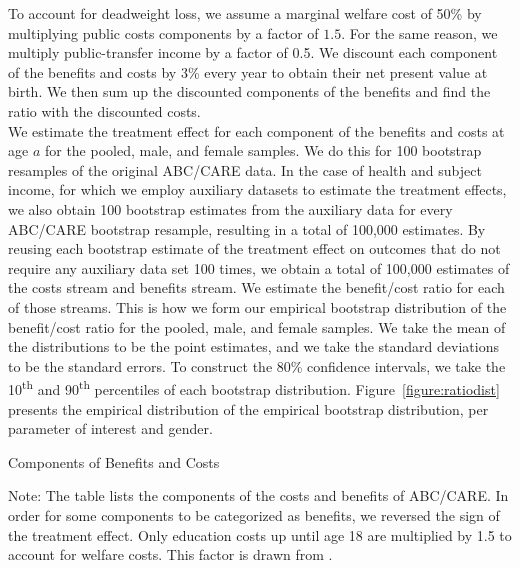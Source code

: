 \noindent To account for deadweight loss, we assume a marginal welfare cost of 50\% by multiplying
public costs components by a factor of $1.5$. For the same reason, we multiply public-transfer
income by a factor of 0.5. We discount each component of the benefits and costs
by 3\% every year to obtain their net present value at birth. We then sum up the discounted
components of the benefits and find the ratio with the discounted costs. \\

\noindent We estimate the treatment effect for each component of the benefits and costs at age $a$ for the pooled, male, and female samples. We do this for 100 bootstrap resamples of the original ABC/CARE data. In the case of health and subject income, for which we employ auxiliary datasets to estimate the treatment effects, we also obtain 100 bootstrap estimates from the auxiliary data for every ABC/CARE bootstrap resample, resulting in a total of 100,000 estimates. By reusing each bootstrap estimate of the treatment effect on outcomes that do not require any auxiliary data set 100 times, we obtain a total of 100,000 estimates of the costs stream and benefits stream. We estimate the benefit/cost ratio for each of those streams. This is how we form our empirical bootstrap distribution of the benefit/cost ratio for the pooled, male, and female samples. We take the mean of the distributions to be the point estimates, and we take the standard deviations to be the standard errors. To construct the 80\% confidence intervals, we take the 10\textsuperscript{th} and 90\textsuperscript{th} percentiles of each bootstrap distribution. Figure~\ref{figure:ratiodist} presents the empirical distribution of the empirical bootstrap distribution, per parameter of interest and gender.

\begin{table}[H]
\begin{threeparttable}
\caption{Components of Benefits and Costs}
\label{table:bc_comp}
\centering

\begin{tablenotes}
\footnotesize
\item Note: The table lists the components of the costs and benefits of ABC/CARE.
In order for some components to be categorized as benefits, we reversed the sign
of the treatment effect. Only education costs up until age 18 are multiplied by 1.5 to account for welfare costs. This factor is drawn from \citet{Heckman_Moon_etal_2010_RateofReturn}.
\end{tablenotes}
\end{threeparttable}
\end{table}

